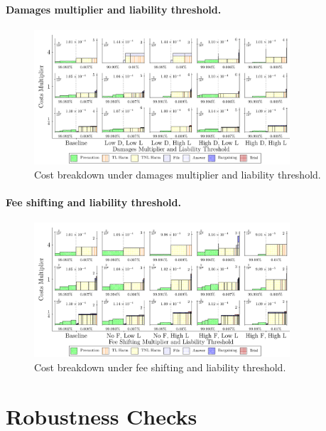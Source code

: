 \documentclass{article}
\begin{document}
\paragraph{Damages multiplier and liability threshold.}
\begin{figure}[ht]
  \centering
  \includegraphics[width=0.85\textwidth]{../Figures/Cost Breakdown Damages Multiplier and Liability Threshold (All Rows).pdf}
  \caption{Cost breakdown under damages multiplier and liability threshold.}
  \label{fig:dm_liability}
\end{figure}

\FloatBarrier
\paragraph{Fee shifting and liability threshold.}
\begin{figure}[ht]
  \centering
  \includegraphics[width=0.85\textwidth]{../Figures/Cost Breakdown Fee Shifting Multiplier and Liability Threshold (All Rows).pdf}
  \caption{Cost breakdown under fee shifting and liability threshold.}
  \label{fig:fee_liability}
\end{figure}

\section{Robustness Checks}
\end{document}
